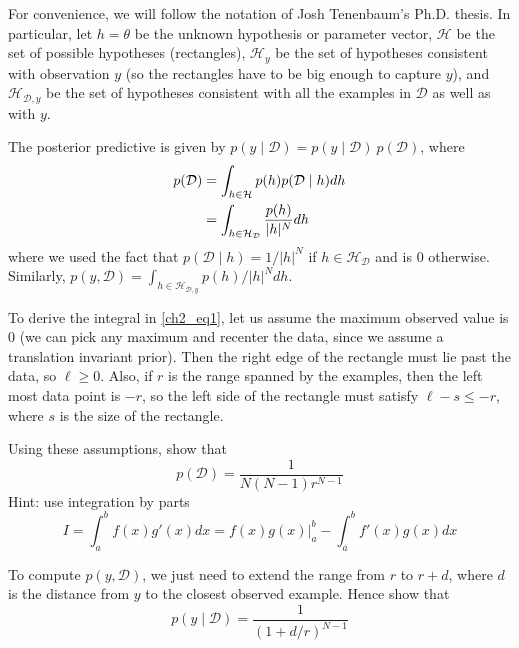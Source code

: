 \begin{exercise}
	\par\smallskip
	For convenience, we will follow the notation of Josh Tenenbaum's Ph.D. thesis. In particular, let \(h = \theta\) be
	the unknown hypothesis or parameter vector, \(\mathcal{H}\) be the set of possible hypotheses (rectangles), 
	\(\mathcal{H}_y\) be the set of hypotheses consistent with observation \(y\) (so the rectangles have to be big 
	enough to capture \(y\)), and \(\mathcal{H}_{\mathcal{D}, y}\) be the set of hypotheses consistent with all the
	examples in \(\mathcal{D}\) as well as with \(y\).
	\par\smallskip
	The posterior predictive is given by \(p(y\mid\mathcal{D}) = p(y\mid\mathcal{D}) \ p(\mathcal{D})\), where
	\begin{align}
		p(\mathcal{D}) &= \int_{h\in\mathcal{H}}p(h)p(\mathcal{D}\mid h)dh\notag\\
		&= \int_{h\in\mathcal{H_{\mathcal{D}}}}\frac{p(h)}{\lvert h\rvert^N}dh\label{ch2_eq1}
	\end{align}
	where we used the fact that \(p(\mathcal{D}\mid h) = 1 / \lvert h\rvert^N\) if \(h\in\mathcal{H_{\mathcal{D}}}\)
	and is \(0\) otherwise. Similarly, 
	\(p(y, \mathcal{D}) = \int_{h\in\mathcal{H}_{\mathcal{D}, y}}p(h) / \lvert h\rvert^Ndh\).
	\par\smallskip
	To derive the integral in \cref{ch2_eq1}, let us assume the maximum observed value is \(0\) (we can pick any
	maximum and recenter the data, since we assume a translation invariant prior). Then the right edge of the
	rectangle must lie past the data, so \(\ell\geq 0\). Also, if \(r\) is the range spanned by the examples, then the
	left most data point is \(-r\), so the left side of the rectangle must satisfy \(\ell - s\leq -r\), where \(s\) is the size
	of the rectangle.
	\begin{exercise}
	\item
		Using these assumptions, show that
		\[
			p(\mathcal{D}) = \frac{1}{N(N - 1)r^{N - 1}}
		\]
		Hint: use integration by parts
		\[
			I = \int_a^bf(x)g'(x)dx = f(x)g(x)\rvert_a^b - \int_a^bf'(x)g(x)dx
		\]
	\item
		To compute \(p(y, \mathcal{D})\), we just need to extend the range from \(r\) to \(r + d\), where \(d\) is the
		distance from \(y\) to the closest observed example. Hence show that
		\[
			p(y\mid\mathcal{D}) = \frac{1}{(1 + d/r)^{N - 1}}
		\]
	\end{exercise}
\end{exercise}


